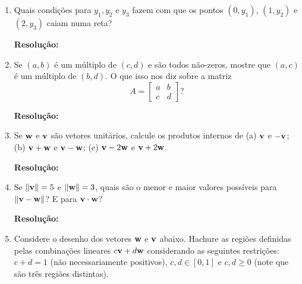 \documentclass[leqno]{article}
\numberwithin{equation}{section}
\newenvironment{sol}
{
    \vspace{4mm}
    \noindent\textbf{Resolução:}
    \strut\newline
    \smallskip
    \hspace{-3.5mm}
}
{}
\begin{document}
\begin{enumerate}

%

\item Quais condições para $y_1, y_2$ e $y_3$ fazem com que os pontos $(0, y_1)$, $(1, y_2)$ e $(2, y_3)$ caiam numa reta?

\begin{sol} 
\end{sol} 

\item Se $(a,b)$ é um múltiplo de $(c,d)$ e são todos não-zeros, mostre que $(a,c)$ é um múltiplo de $(b,d)$. O que isso nos diz sobre a matriz
$$A = \begin{bmatrix}
a & b \\
c & d
\end{bmatrix}?$$ 

\begin{sol} 
\end{sol} 

\item Se $\mathbf{w}$ e $\mathbf{v}$ são vetores unitários, calcule os produtos internos de (a) $\mathbf{v}$ e $-\mathbf{v}$; (b) $\mathbf{v} + \mathbf{w}$ e $\mathbf{v} - \mathbf{w}$; (c) $\mathbf{v} - 2\mathbf{w}$ e $\mathbf{v} + 2\mathbf{w}$.

\begin{sol} 
\end{sol} 

\item Se $\| \mathbf{v} \| = 5$ e $\| \mathbf{w} \| = 3$, quais são o menor e maior valores possíveis para $\|\mathbf{v} - \mathbf{w}\|$? E para $\mathbf{v} \cdot \mathbf{w}$?

\begin{sol} 
\end{sol} 

\item Considere o desenho dos vetores $\mathbf{w}$ e $\mathbf{v}$ abaixo. Hachure as regiões definidas pelas combinações lineares $c \mathbf{v} + d \mathbf{w}$ considerando as seguintes restrições: $c + d = 1$ (não necessariamente positivos), $c,d \in [0,1]$ e $c,d \geq 0$ (note que são três regiões distintas).


\end{enumerate}
\end{document}
